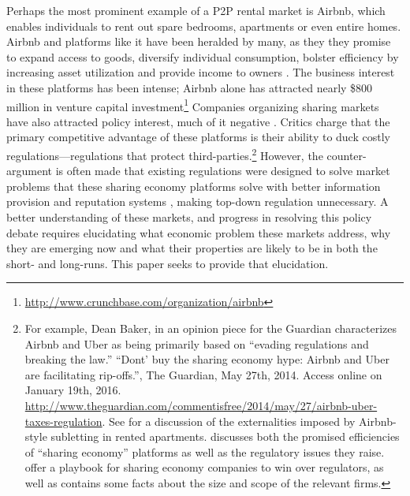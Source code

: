 \documentclass[11pt]{article}
\begin{document}
Perhaps the most prominent example of a P2P rental market is Airbnb, which enables individuals to rent out spare bedrooms, apartments or even entire homes. 
Airbnb and platforms like it have been heralded by many, as they they promise to expand access to goods, diversify individual consumption, bolster efficiency by increasing asset utilization and provide income to owners \citep{sundararajan2013zipcar, edelman2015efficiencies, botsman2010s}.
The business interest in these platforms has been intense; Airbnb alone has attracted nearly \$800 million in venture capital investment\footnote{\href{http://www.crunchbase.com/organization/airbnb}{http://www.crunchbase.com/organization/airbnb}}
Companies organizing sharing markets have also attracted policy interest, much of it negative \citep{slee2015, malhotra2014dark}. 
Critics charge that the primary competitive advantage of these platforms is their ability to duck costly regulations---regulations that protect third-parties.\footnote{
  For example, Dean Baker, in an opinion piece for the Guardian characterizes Airbnb and Uber as being primarily based on ``evading regulations and breaking the law.''
  ``Dont' buy the sharing economy hype: Airbnb and Uber are facilitating rip-offs.'', The Guardian, May 27th, 2014. Access online on January 19th, 2016.
  \url{http://www.theguardian.com/commentisfree/2014/may/27/airbnb-uber-taxes-regulation}. 
  See \cite{horton2014tragedy} for a discussion of the externalities imposed by Airbnb-style subletting in rented apartments.
  \cite{edelman2015efficiencies} discusses both the promised efficiencies of ``sharing economy'' platforms as well as the regulatory issues they raise.
  \cite{cannon2014uber} offer a playbook for sharing economy companies to win over regulators, as well as contains some facts about the size and scope of the relevant firms.
}   
However, the counter-argument is often made that existing regulations were designed to solve market problems that these sharing economy platforms solve with better information provision and reputation systems \citep{koopman2014sharing}, making top-down regulation unnecessary.  
A better understanding of these markets, and progress in resolving this policy debate requires elucidating what economic problem these markets address, why they are emerging now and what their properties are likely to be in both the short- and long-runs. 
This paper seeks to provide that elucidation. 
\end{document}
